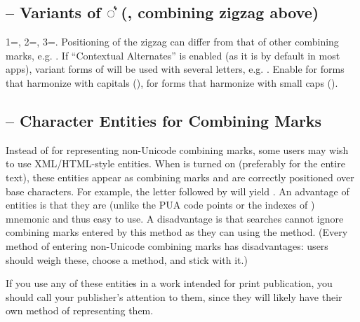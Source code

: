 \subsection{ – Variants of ◌͛ (, combining
zigzag above)}
1=, 2=, 3=. Positioning of the zigzag can differ from that of other combining
marks, e.g. . If  “Contextual Alternates” is enabled (as it is by
default in most apps), variant forms of  will be used with several letters, e.g.
. Enable  for forms that harmonize with capitals
(),
 for forms that harmonize with small caps
().

\subsection{ – Character Entities for Combining Marks}\hypertarget{ss10}{}
Instead of  for representing non-Unicode combining marks, some users may
wish to use XML/HTML-style entities. When  is turned on (preferably for the entire
text), these entities appear as combining marks and are correctly positioned over base characters.
For example, the letter  followed by
 will yield . An advantage of entities is that
they are (unlike the PUA code points or the indexes of ) mnemonic and thus easy to use.
A disadvantage is that
searches cannot ignore combining marks entered by this method as they can using the  method.
(Every method of entering non-Unicode combining marks has disadvantages: users should weigh these, choose a method,
and stick with it.)

If you use any of these entities in a work intended for print publication, you should call your publisher’s
attention to them, since they will likely have their own method of representing them.

